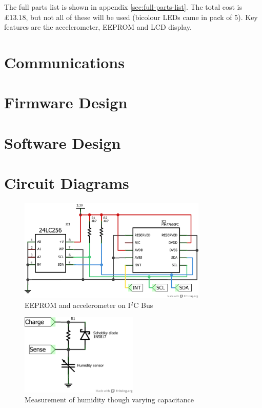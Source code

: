 \documentclass[a4paper,11pt]{article}  %
\begin{document}
The full parts list is shown in appendix
\ref{sec:full-parts-list}. The total cost is $\pounds 13.18$, but not
all of these will be used (bicolour LEDs came in pack of 5). Key
features are the accelerometer, EEPROM and LCD display.

\section{Communications}
\label{sec:communications}

\section{Firmware Design}
\label{sec:firmware-design}

\section{Software Design}
\label{sec:software-design}

\newpage
\appendix

\section{Circuit Diagrams}
\label{sec:circuit-diagrams}

\begin{figure}[!h]
  \begin{center}
    \includegraphics[width=0.8\textwidth]{i2c_schem.png}
  \end{center}
  \caption{EEPROM and accelerometer on I$^2$C Bus}
  \label{fig:i2cbus}
\end{figure}

\begin{figure}[!h]
  \begin{center}
    \includegraphics[width=0.5\textwidth]{humiditysensor_schem.png}
  \end{center}
  \caption{Measurement of humidity though varying capacitance}
  \label{fig:humcir}
\end{figure}
\end{document}
